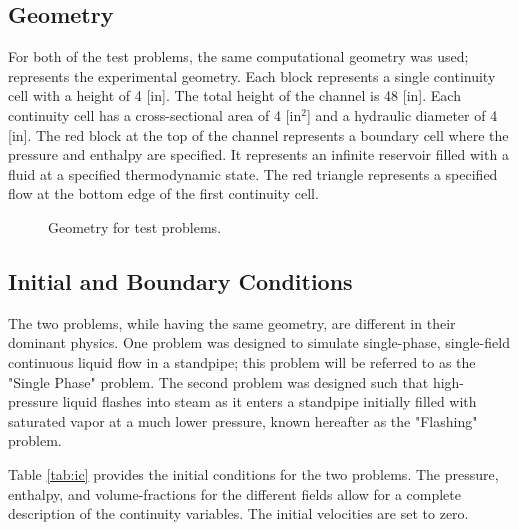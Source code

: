 \subsection{Geometry}
\label{subsect:experimental_geometry}
For both of the test problems, the same computational geometry was used;   represents the experimental geometry.
Each block represents a single continuity cell with a height of 4 [in].
The total height of the channel is 48 [in].
Each continuity cell has a cross-sectional area of 4 [in$^2$] and a hydraulic diameter of 4 [in].
The red block at the top of the channel represents a boundary cell where the pressure and enthalpy are specified.
It represents an infinite reservoir filled with a fluid at a specified thermodynamic state.
The red triangle represents a specified flow at the bottom edge of the first continuity cell. 

\begin{figure}[h!t]
\begin{center}
\end{center}
\caption{Geometry for test problems.}
\label{fig:exp_geometry}
\end{figure}

\subsection{Initial and Boundary Conditions}
\label{subsect:ic_bc}

The two problems, while having the same geometry, are different in their dominant physics.
One problem was designed to simulate single-phase, single-field continuous liquid flow in a standpipe; this problem will be referred to as the "Single Phase" problem.
The second problem was designed such that high-pressure liquid flashes into steam as it enters a standpipe initially filled with saturated vapor at a much lower pressure, known hereafter as the "Flashing" problem.

Table \ref{tab:ic} provides the initial conditions for the two problems.
The pressure, enthalpy, and volume-fractions for the different fields allow for a complete description of the continuity variables.
The initial velocities are set to zero.

